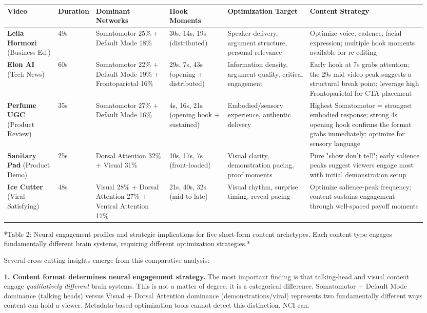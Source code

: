 \documentclass[11pt,letterpaper]{article}
\begin{document}
\begin{table}[htbp]
\centering
\small
\begin{tabular}{|p{}|p{}|p{}|p{}|p{}|p{}|}
\hline
Video & Duration & Dominant Networks & Hook Moments & Optimization Target & Content Strategy \\
\hline
\textbf{Leila Hormozi} (Business Ed.) & 49s & Somatomotor 25\% + Default Mode 18\% & 30s, 14s, 19s (distributed) & Speaker delivery, argument structure, personal relevance & Optimize voice, cadence, facial expression; multiple hook moments available for re-editing \\
\textbf{Elon AI} (Tech News) & 60s & Somatomotor 22\% + Default Mode 19\% + Frontoparietal 16\% & 29s, 7s, 43s (opening + distributed) & Information density, argument quality, critical engagement & Early hook at 7s grabs attention; the 29s mid-video peak suggests a structural break point; leverage high Frontoparietal for CTA placement \\
\textbf{Perfume UGC} (Product Review) & 35s & Somatomotor 27\% + Default Mode 16\% & 4s, 16s, 21s (opening hook + sustained) & Embodied/sensory experience, authentic delivery & Highest Somatomotor = strongest embodied response; strong 4s opening hook confirms the format grabs immediately; optimize for sensory language \\
\textbf{Sanitary Pad} (Product Demo) & 25s & Dorsal Attention 32\% + Visual 31\% & 10s, 17s, 7s (front-loaded) & Visual clarity, demonstration pacing, proof moments & Pure "show don't tell"; early salience peaks suggest viewers engage most with initial demonstration setup \\
\textbf{Ice Cutter} (Viral Satisfying) & 48s & Visual 28\% + Dorsal Attention 27\% + Ventral Attention 17\% & 21s, 40s, 32s (mid-to-late) & Visual rhythm, surprise timing, reveal pacing & Optimize salience-peak frequency; content sustains engagement through well-spaced payoff moments \\
\hline
\end{tabular}
\end{table}
*Table 2: Neural engagement profiles and strategic implications for five short-form content archetypes. Each content type engages fundamentally different brain systems, requiring different optimization strategies.*

Several cross-cutting insights emerge from this comparative analysis:

\textbf{1. Content format determines neural engagement strategy.} The most important finding is that talking-head and visual content engage \textit{qualitatively different} brain systems. This is not a matter of degree, it is a categorical difference. Somatomotor + Default Mode dominance (talking heads) versus Visual + Dorsal Attention dominance (demonstrations/viral) represents two fundamentally different ways content can hold a viewer. Metadata-based optimization tools cannot detect this distinction. NCI can.
\end{document}
